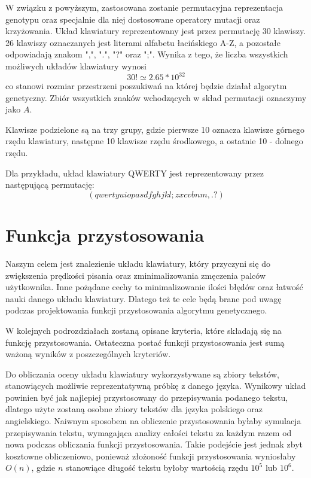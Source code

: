 \documentclass[brudnopis]{xmgr}
\begin{document}
W związku z powyższym, zastosowana zostanie permutacyjna reprezentacja genotypu oraz specjalnie dla niej dostosowane operatory mutacji oraz krzyżowania. Układ klawiatury reprezentowany jest przez permutację 30 klawiszy. 26 klawiszy oznaczanych jest literami alfabetu łacińskiego A-Z, a pozostałe odpowiadają znakom ",", ".", "?" oraz ";". Wynika z tego, że liczba wszystkich możliwych układów klawiatury wynosi $$ 30! \simeq 2.65 * 10^{32} $$ co stanowi rozmiar przestrzeni poszukiwań na której będzie działał algorytm genetyczny. Zbiór wszystkich znaków wchodzących w skład permutacji oznaczymy jako $ A $.

Klawisze podzielone są na trzy grupy, gdzie pierwsze 10 oznacza klawisze górnego rzędu klawiatury, następne 10 klawisze rzędu środkowego, a ostatnie 10 - dolnego rzędu.

Dla przykładu, układ klawiatury QWERTY jest reprezentowany przez następującą permutację:
$$ (qwertyuiopasdfghjkl;zxcvbnm,.?) $$


\section{Funkcja przystosowania}

Naszym celem jest znalezienie układu klawiatury, który przyczyni się do zwiększenia prędkości pisania oraz zminimalizowania zmęczenia palców użytkownika. Inne pożądane cechy to minimalizowanie ilości błędów oraz łatwość nauki danego układu klawiatury. Dlatego też te cele będą brane pod uwagę podczas projektowania funkcji przystosowania algorytmu genetycznego.

W kolejnych podrozdziałach zostaną opisane kryteria, które składają się na funkcję przystosowania. Ostateczna postać funkcji przystosowania jest sumą ważoną wyników z poszczególnych kryteriów.

Do obliczania oceny układu klawiatury wykorzystywane są zbiory tekstów, stanowiących możliwie reprezentatywną próbkę z danego języka. Wynikowy układ powinien być jak najlepiej przystosowany do przepisywania podanego tekstu, dlatego użyte zostaną osobne zbiory tekstów dla języka polskiego oraz angielskiego. Naiwnym sposobem na obliczenie przystosowania byłaby symulacja przepisywania tekstu, wymagająca analizy całości tekstu za każdym razem od nowa podczas obliczania funkcji przystosowania. Takie podejście jest jednak zbyt kosztowne obliczeniowo, ponieważ złożoność funkcji przystosowania wyniosłaby $ O(n) $, gdzie $ n $ stanowiące długość tekstu byłoby wartością rzędu $ 10^5 $ lub $ 10^6 $.
\end{document}
